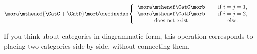 \begin{ctdefinition}
\begin{enumerate}
              \begin{equation}
                  \mora \mthenof{\CatC+\CatD} \morb \definedas
                  \left\{
                  \begin{tabular}{ccc}
                      $\mora\mthenof\CatC \morb$  &  & if $i=j = 1$, \\
                      $\mora \mthenof\CatD \morb$ &  & if $i = j =2$, \\
                      does not exist              &  & else.
                  \end{tabular}
                  \right.{}
              \end{equation}
    \end{enumerate}
\end{ctdefinition}

\begin{remark}
    If you think about categories in diagrammatic form, this operation corresponds to placing two categories side-by-side, without connecting them.
\end{remark}

